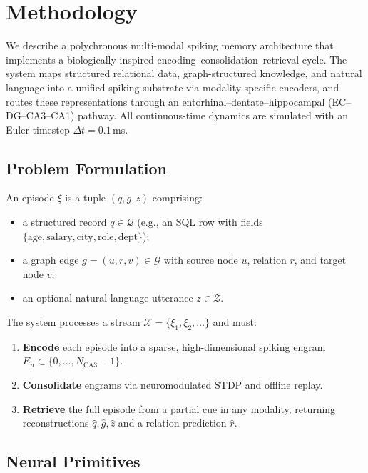 \section{Methodology}
\label{sec:methodology}

We describe a polychronous multi-modal spiking memory architecture that implements a biologically inspired encoding--consolidation--retrieval cycle. The system maps structured relational data, graph-structured knowledge, and natural language into a unified spiking substrate via modality-specific encoders, and routes these representations through an entorhinal--dentate--hippocampal (EC--DG--CA3--CA1) pathway. All continuous-time dynamics are simulated with an Euler timestep $\Delta t = 0.1$\,ms.

\subsection{Problem Formulation}
\label{sec:problem}

An episode $\xi$ is a tuple $(q, g, z)$ comprising:
\begin{itemize}
    \item a structured record $q \in \mathcal{Q}$ (e.g., an SQL row with fields $\{\text{age},\text{salary},\text{city},\text{role},\text{dept}\}$);
    \item a graph edge $g = (u, r, v) \in \mathcal{G}$ with source node $u$, relation $r$, and target node $v$;
    \item an optional natural-language utterance $z \in \mathcal{Z}$.
\end{itemize}
The system processes a stream $\mathcal{X} = \{\xi_1, \xi_2, \dots\}$ and must:
\begin{enumerate}
    \item \textbf{Encode} each episode into a sparse, high-dimensional spiking engram $E_n \subset \{0,\dots,N_{\text{CA3}}-1\}$.
    \item \textbf{Consolidate} engrams via neuromodulated STDP and offline replay.
    \item \textbf{Retrieve} the full episode from a partial cue in any modality, returning reconstructions $\hat{q}, \hat{g}, \hat{z}$ and a relation prediction $\hat{r}$.
\end{enumerate}

\subsection{Neural Primitives}
\label{sec:primitives}


